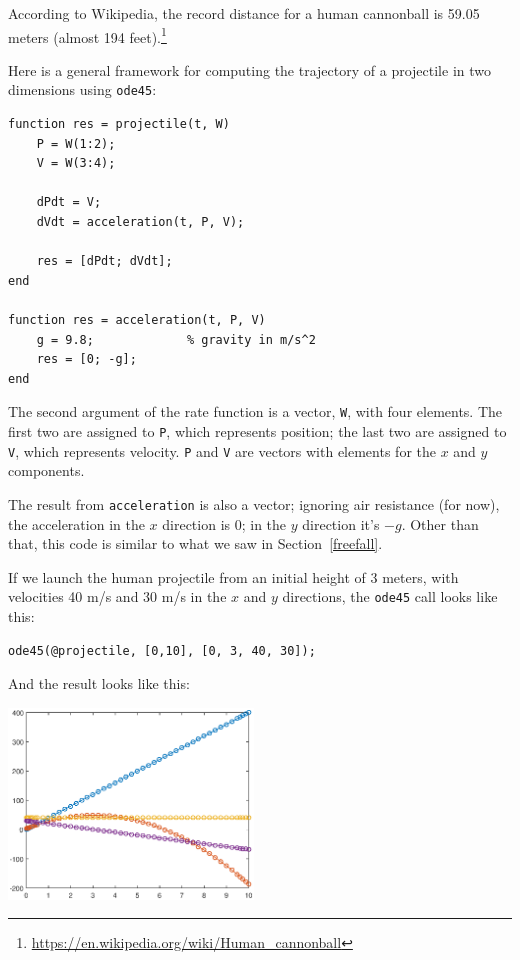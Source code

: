\documentclass{book}
\begin{document}
According to Wikipedia, the record distance for a human cannonball is
59.05 meters (almost 194
feet).\footnote{\url{https://en.wikipedia.org/wiki/Human_cannonball}}

Here is a general framework for computing the trajectory of a projectile
in two dimensions using {\tt ode45}:

\begin{verbatim}
function res = projectile(t, W)
    P = W(1:2);
    V = W(3:4);

    dPdt = V;
    dVdt = acceleration(t, P, V);

    res = [dPdt; dVdt];
end

function res = acceleration(t, P, V)
    g = 9.8;             % gravity in m/s^2
    res = [0; -g];
end
\end{verbatim}

The second argument of the rate function is a vector, {\tt W}, with
four elements.  The first two are assigned to {\tt P}, which
represents position; the last two are assigned to {\tt V}, which
represents velocity.
{\tt P} and {\tt V} are vectors with
elements for the $x$ and $y$ components.

The result from
{\tt acceleration} is also a vector; ignoring air resistance
(for now), the acceleration in the $x$ direction is 0; in
the $y$ direction it's $-g$.
Other than that, this code is similar to what we saw in
Section~\ref{freefall}.

If we launch the human projectile from an initial height of
3 meters, with velocities 40 m/s and 30 m/s in the $x$ and $y$
directions, the {\tt ode45} call looks like
this:

\begin{verbatim}
ode45(@projectile, [0,10], [0, 3, 40, 30]);
\end{verbatim}

And the result looks like this:

\beforefig \centerline{\includegraphics[height=2in]{figs/proj1_10s.eps}}
\end{document}
